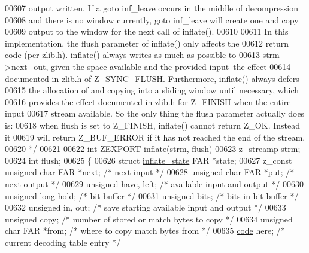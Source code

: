 \begin{DoxyCode}
{{{{00607 \textcolor{comment}{   output written.  If a goto inf\_leave occurs in the middle of decompression}
00608 \textcolor{comment}{   and there is no window currently, goto inf\_leave will create one and copy}
00609 \textcolor{comment}{   output to the window for the next call of inflate().}
00610 \textcolor{comment}{}
00611 \textcolor{comment}{   In this implementation, the flush parameter of inflate() only affects the}
00612 \textcolor{comment}{   return code (per zlib.h).  inflate() always writes as much as possible to}
00613 \textcolor{comment}{   strm->next\_out, given the space available and the provided input--the effect}
00614 \textcolor{comment}{   documented in zlib.h of Z\_SYNC\_FLUSH.  Furthermore, inflate() always defers}
00615 \textcolor{comment}{   the allocation of and copying into a sliding window until necessary, which}
00616 \textcolor{comment}{   provides the effect documented in zlib.h for Z\_FINISH when the entire input}
00617 \textcolor{comment}{   stream available.  So the only thing the flush parameter actually does is:}
00618 \textcolor{comment}{   when flush is set to Z\_FINISH, inflate() cannot return Z\_OK.  Instead it}
00619 \textcolor{comment}{   will return Z\_BUF\_ERROR if it has not reached the end of the stream.}
00620 \textcolor{comment}{ */}
00621 
00622 \textcolor{keywordtype}{int} ZEXPORT inflate(strm, flush)
00623 z\_streamp strm;
00624 \textcolor{keywordtype}{int} flush;
00625 \{
00626     \textcolor{keyword}{struct }\hyperlink{structinflate__state}{inflate\_state} FAR *state;
00627     z\_const \textcolor{keywordtype}{unsigned} \textcolor{keywordtype}{char} FAR *next;    \textcolor{comment}{/* next input */}
00628     \textcolor{keywordtype}{unsigned} \textcolor{keywordtype}{char} FAR *put;     \textcolor{comment}{/* next output */}
00629     \textcolor{keywordtype}{unsigned} have, left;        \textcolor{comment}{/* available input and output */}
00630     \textcolor{keywordtype}{unsigned} \textcolor{keywordtype}{long} hold;         \textcolor{comment}{/* bit buffer */}
00631     \textcolor{keywordtype}{unsigned} bits;              \textcolor{comment}{/* bits in bit buffer */}
00632     \textcolor{keywordtype}{unsigned} in, out;           \textcolor{comment}{/* save starting available input and output */}
00633     \textcolor{keywordtype}{unsigned} copy;              \textcolor{comment}{/* number of stored or match bytes to copy */}
00634     \textcolor{keywordtype}{unsigned} \textcolor{keywordtype}{char} FAR *from;    \textcolor{comment}{/* where to copy match bytes from */}
00635     \hyperlink{structcode}{code} here;                  \textcolor{comment}{/* current decoding table entry */}
}}}}
\end{DoxyCode}
